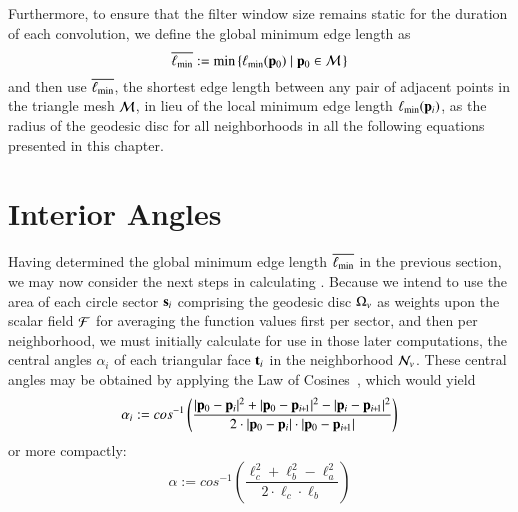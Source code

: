 Furthermore, to ensure that the filter window size remains static for the duration of each convolution, we define the global minimum edge length as
%
\begin{equation}
	\overline{\ell_\text{min}} := \min\left \{\ell_\text{min}(\mathbf{p}_0) \;|\; \mathbf{p}_0 \in \mathcal{M}\,\right \}
	\label{eq:globalMinimumEdgeLength}
\end{equation}%
%
%
and then use $\overline{\ell_\text{min}}$, the shortest edge length between any pair of adjacent points in the triangle mesh $\mathcal{M}$, in lieu of the local minimum edge length $\ell_\text{min}(\mathbf{p}_i)$, as the radius of the geodesic disc for all neighborhoods in all the following equations presented in this chapter.

%
%
%
\section{Interior Angles}
\label{ch3sIA}
Having determined the global minimum edge length $\overline{\ell_\text{min}}$ in the previous section, we may now consider the next steps in calculating . Because we intend to use the area of each circle sector $\mathbf{s}_i$ comprising the geodesic disc $\Omega_v$ as weights upon the scalar field $\mathcal{F}$ for averaging the function values first per sector, and then per neighborhood, we must initially calculate for use in those later computations, the central angles $\alpha_i$ of each triangular face $\mathbf{t}_i$ in the neighborhood $\mathcal{N}_v$. These central angles may be obtained by applying the Law of Cosines~\cite{Weisstein19e}, which would yield
%
\begin{equation}
	\alpha_i := cos^{-1}\left (\frac{|\bp_0 - \bp_{i}|^2 + |\bp_0 - \bp_{\sipo}|^2 - |\bp_i - \bp_{\sipo}|^2}{2\cdot|\bp_0 - \bp_{i}|\cdot|\bp_0 - \bp_{\sipo}|}\right )
\end{equation}
%
or more compactly:
%
\begin{equation}
	\alpha := cos^{-1}\left (\frac{\ell_c^2 + \ell_b^2 - \ell_a^2}{2\cdot\ell_c\cdot\ell_b}\right )
	\label{eq:alphaFromEdgeLengths}
\end{equation}%
%

